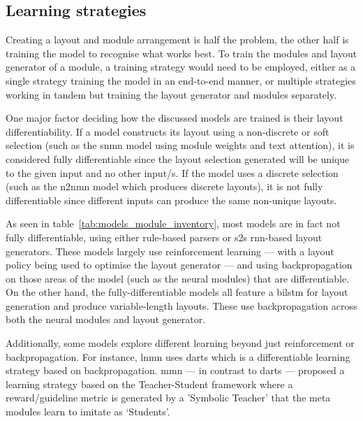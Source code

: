 \subsection{Learning strategies}
\label{subsec:learning_strategies}

Creating a layout and module arrangement is half the problem, the other half is training the model to recognise what works best.
To train the modules and layout generator of a module, a training strategy would need to be employed, either as a single strategy training the model in an end-to-end manner, or multiple strategies working in tandem but training the layout generator and modules separately.

One major factor deciding how the discussed models are trained is their layout differentiability.
If a model constructs its layout using a non-discrete or soft selection (such as the \gls{snmn} model using module weights and text attention), it is considered fully differentiable since the layout selection generated will be unique to the given input and no other input/s.
If the model uses a discrete selection (such as the \gls{n2nmn} model which produces discrete layouts), it is not fully differentiable since different inputs can produce the same non-unique layouts.

As seen in table~\ref{tab:models_module_inventory}, most models are in fact not fully differentiable, using either rule-based parsers\cite{andreas_neural_2016,chen_meta_2020} or \gls{s2s} \gls{rnn}-based layout generators\cite{hu_learning_2017,chen_teaching_2022,su_toward_2020,kottur_visual_2018,cho_visual_2021}.
These models largely use reinforcement learning --- with a layout policy being used to optimise the layout generator --- and using backpropagation on those areas of the model (such as the neural modules) that are differentiable.
On the other hand, the fully-differentiable models all feature a \gls{bilstm} for layout generation and produce variable-length layouts\cite{hudson_compositional_2018}.
These use backpropagation across both the neural modules and layout generator.

Additionally, some models explore different learning beyond just reinforcement or backpropagation.
For instance, \gls{lnmn} uses \gls{darts}\cite{liu_darts_2019} which is a differentiable learning strategy based on backpropagation.
\gls{mmn} --- in contrast to \gls{darts} --- proposed a learning strategy based on the Teacher-Student framework\cite{zimmer_teacher_2014} where a reward/guideline metric is generated by a 'Symbolic Teacher' that the meta modules learn to imitate as `Students'\cite{chen_meta_2020}.

